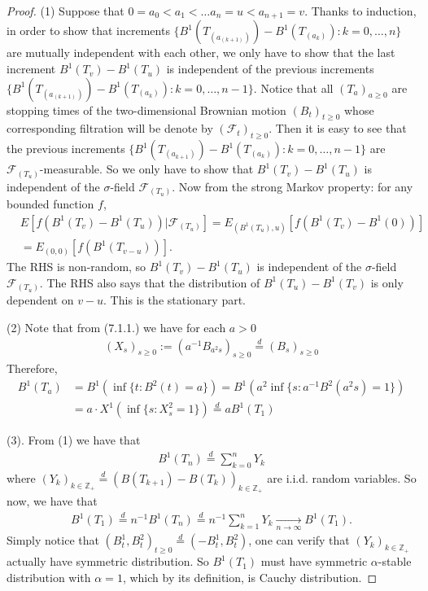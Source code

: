\documentclass[12pt,a4paper]{amsart}
\theoremstyle{plain}
\theoremstyle{definition}
\theoremstyle{remark}
\numberwithin{equation}{section}
\begin{document}
\begin{proof}
  (1) Suppose that $0 = a_0 < a_1 < \dots a_{n} = u < a_{n+1} = v$. Thanks to induction, in order to show that increments $\{B^1(T_{(a_{(k+1)})}) - B^1(T_{(a_k)}):k=0,\dots,n\}$ are mutually independent with each other, we only have to show that the last increment $B^1(T_{v})- B^1(T_{u})$ is independent of the previous increments $\{B^1(T_{(a_{(k+1)})}) - B^1(T_{(a_k)}):k=0,\dots,n - 1\}$.
Notice that all $(T_{a})_{a\geq 0}$ are stopping times of the two-dimensional Brownian motion $(B_t)_{t\geq 0}$ whose corresponding filtration will be denote by $(\mathcal F_t)_{t\geq 0}$. 
Then it is easy to see that the previous increments $\{B^1(T_{(a_{k+1})}) - B^1(T_{(a_k)}):k=0,\dots,n - 1\}$ are $\mathcal F_{(T_{u})}$-measurable.
So we only have to show that $B^1(T_v) - B^1(T_u)$ is independent of the $\sigma$-field $\mathcal F_{(T_u)}$. 
Now from the strong Markov property: for any bounded function $f$,
\begin{align}
&E\left[f\left(B^1(T_v) - B^1(T_u)\right) | \mathcal F_{(T_u)}\right]
= E_{(B^1(T_u), u)} \left[ f\left( B^1(T_v) - B^1(0) \right) \right]
\\&= E_{(0,0)}\left[ f \left( B^1(T_{v-u}) \right)\right].
\end{align}
The RHS is non-random, so $B^1(T_v)- B^1(T_u)$ is independent of the $\sigma$-field $\mathcal F_{(T_u)}$.
The RHS also says that the distribution of $B^1(T_u) - B^1(T_v)$ is only dependent on $v-u$. This is the stationary part.

(2) Note that from (7.1.1.) we have for each $a > 0$
\begin{align}
(X_s)_{s\geq 0}:=(a^{-1}B_{a^2s})_{s\geq 0} \overset{d}{=} (B_s)_{s\geq 0}
\end{align}
Therefore,
\begin{align}
B^1(T_a) 
&= B^1(\inf\{t: B^2(t) = a\}) 
= B^1(a^2\inf\{ s: a^{-1}B^2(a^2 s) = 1\})
\\&= a \cdot X^1(\inf\{s:X^2_s = 1\})
\overset{d}{=}aB^1(T_1)  
\end{align}

(3). From (1) we have that
\begin{align}
B^1(T_n) \overset{d}= \sum_{k=0}^{n} Y_k
\end{align}
where $(Y_k)_{k\in \mathbb Z_+} \overset{d}= \left( B(T_{k+1}) - B(T_k) \right)_{k \in \mathbb Z_+}$ are i.i.d. random variables. So now, we have that
\begin{align}
B^1(T_1) \overset{d}{=} n^{-1}B^1(T_n)\overset{d}{=}n^{-1}\sum_{k=1}^n Y_k 
\xrightarrow[n\to \infty]{} B^1(T_1).
\end{align}
Simply notice that $(B^1_t,B^2_t)_{t\geq 0} \overset{d}= (-B^1_t,B^2_t)$, one can verify that $(Y_k)_{k\in \mathbb Z_+}$ actually have symmetric distribution.
So $B^1(T_1)$ must have symmetric $\alpha$-stable distribution with $\alpha = 1$, which by its definition, is Cauchy distribution.
\end{proof}
\end{document}
